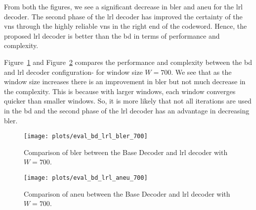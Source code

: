 From both the figures, we see a significant decrease in \ac{bler} and \ac{aneu} for the \ac{lrl} decoder. The second phase of the \ac{lrl} decoder has improved the certainty of the \acp{vn} through the highly reliable \acp{vn} in the right end of the codeword. Hence, the proposed \ac{lrl} decoder is better than the \ac{bd} in terms of performance and complexity.

Figure~\ref{fig:eval_bd_lrl_bler_700} and Figure~\ref{fig:eval_bd_lrl_aneu_700} compares the performance and complexity between the \ac{bd} and \ac{lrl} decoder configuration- for window size $W=700$. We see that as the window size increases there is an improvement in \ac{bler} but not much decrease in the complexity. This is because with larger windows, each window converges quicker than smaller windows. So, it is more likely that not all iterations are used in the \ac{bd} and the second phase of the \ac{lrl} decoder has an advantage in decreasing \ac{bler}. 
\begin{figure}[htbp]
  \centering
  \texttt{[image: plots/eval\_bd\_lrl\_bler\_700]}
  \caption{Comparison of \ac{bler} between the Base Decoder and \ac{lrl} decoder with $W=700$.}
  \label{fig:eval_bd_lrl_bler_700}
\end{figure}
\begin{figure}[htbp]
  \centering
  \texttt{[image: plots/eval\_bd\_lrl\_aneu\_700]}
  \caption{Comparison of \ac{aneu} between the Base Decoder and \ac{lrl} decoder with $W=700$.}
  \label{fig:eval_bd_lrl_aneu_700}
\end{figure}

